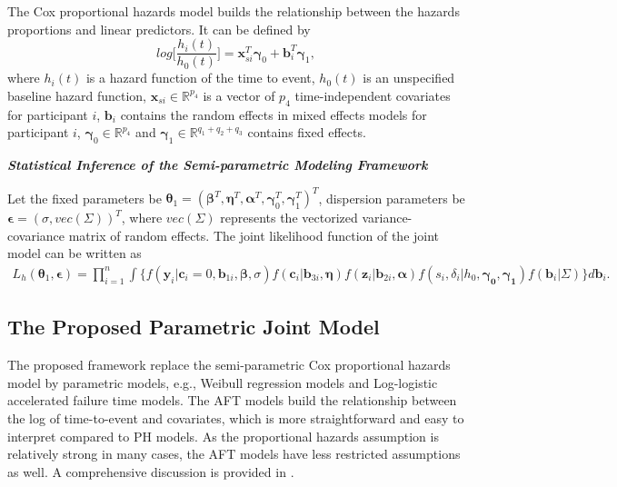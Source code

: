 The Cox proportional hazards model builds the relationship between the hazards proportions and linear predictors. It can be defined by
\begin{equation}
    log\Big[\frac{h_i(t)}{h_0(t)}\Big] = \boldsymbol{x}_{si}^T \boldsymbol{\gamma}_0 + \boldsymbol{b}_i^T  \boldsymbol{\gamma}_1,
\end{equation}
where $h_i(t)$ is a hazard function of the time to event, $h_0(t)$ is an unspecified baseline hazard function, $\boldsymbol{x}_{si}\in \mathbb{R}^{p_4}$ is a vector of $p_4$ time-independent covariates for participant $i$, $\boldsymbol{b}_i$ contains the random effects in mixed effects models for participant $i$, $\boldsymbol{\gamma}_0\in \mathbb{R}^{p_4}$ and $\boldsymbol{\gamma}_1\in \mathbb{R}^{q_1+q_2+q_3}$ contains fixed effects.


\vspace{2mm}
\noindent \textbf{\textit{Statistical Inference of the Semi-parametric Modeling Framework}}
\vspace{2mm}


Let the fixed parameters be $\boldsymbol{\theta}_1 = (\boldsymbol{\beta}^T,\boldsymbol{\eta}^T,\boldsymbol{\alpha}^T, \boldsymbol{\gamma}_0^T,\boldsymbol{\gamma}_1^T)^T$, dispersion parameters be $\boldsymbol{\epsilon} = (\sigma, vec({\Sigma}))^T$, where $vec({\Sigma})$ represents the vectorized variance-covariance matrix of random effects. 
The joint likelihood function of the joint model can be written as
\begin{equation}
    \begin{split}
        L_h (\boldsymbol{\theta}_1,\boldsymbol{\epsilon}) = \prod_{i=1}^n \int\{ f(\boldsymbol{y}_{i}|\boldsymbol{c}_{i}=0,\boldsymbol{b}_{1i},\boldsymbol{\beta},\sigma) f(\boldsymbol{c}_{i}|\boldsymbol{b}_{3i},\boldsymbol{\eta}) f(\boldsymbol{z}_{i}|\boldsymbol{b}_{2i},\boldsymbol{\alpha}) f(s_i,\delta_i|h_0,\boldsymbol{\gamma_0},\boldsymbol{\gamma_1}) f(\boldsymbol{b}_i|\Sigma)\} d \boldsymbol{b}_i.
    \end{split}
\end{equation}



\subsection{The Proposed Parametric Joint Model}

The proposed framework replace the semi-parametric Cox proportional hazards model by parametric models, e.g.,  Weibull regression models and Log-logistic accelerated failure time models. The AFT models build the relationship between the log of time-to-event and covariates, which is more straightforward and easy to interpret compared to PH models. As the proportional hazards assumption is relatively strong in many cases, the AFT models have less restricted assumptions as well. A comprehensive discussion is provided in \cite{wang2006estimation}.

